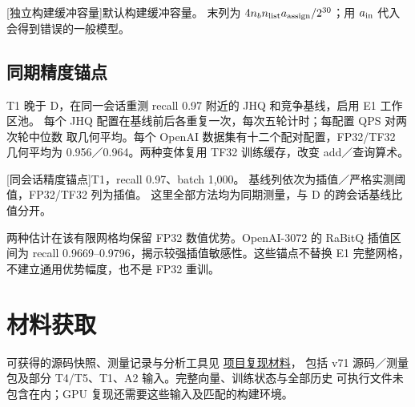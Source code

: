 \par\medskip\noindent\begin{minipage}{\linewidth}
\centering\captionsetup{hypcap=false}
[独立构建缓冲容量]{默认构建缓冲容量。
末列为 $4n_b n_{\rm list}a_{\rm assign}/2^{30}$；用 $a_{\rm in}$ 代入会得到错误的一般模型。}
\label{tab:b-scratch}
\footnotesize
\end{minipage}\par\medskip

\subsection{同期精度锚点}
\label{sec:b-precision-anchors}

T1 晚于 D，在同一会话重测 recall 0.97 附近的 JHQ 和竞争基线，启用 E1 工作区池。
每个 JHQ 配置在基线前后各重复一次，每次五轮计时；每配置 QPS 对两次轮中位数
取几何平均。每个 OpenAI 数据集有十二个配对配置，FP32/TF32 几何平均为
0.956／0.964。两种变体复用 TF32 训练缓存，改变 add／查询算术。

\par\medskip\noindent\begin{minipage}{\linewidth}
\centering\captionsetup{hypcap=false}
[同会话精度锚点]{T1，recall 0.97、batch 1,000。
基线列依次为插值／严格实测阈值，FP32/TF32 列为插值。
这里全部方法均为同期测量，与 D 的跨会话基线比值分开。}
\label{tab:b-precision-anchors}
\footnotesize\setlength{\tabcolsep}{3pt}

\end{minipage}\par\medskip

两种估计在该有限网格均保留 FP32 数值优势。OpenAI-3072 的 RaBitQ 插值区间为
recall 0.9669--0.9796，揭示较强插值敏感性。这些锚点不替换 E1 完整网格，
不建立通用优势幅度，也不是 FP32 重训。

\section{材料获取}
\label{sec:b-artifacts}
可获得的源码快照、测量记录与分析工具见
\href{https://github.com/lrlorry/8800_report/blob/main/docs/artifact-access.md}{项目复现材料}，
包括 v71 源码／测量包及部分 T4/T5、T1、A2 输入。完整向量、训练状态与全部历史
可执行文件未包含在内；GPU 复现还需要这些输入及匹配的构建环境。
